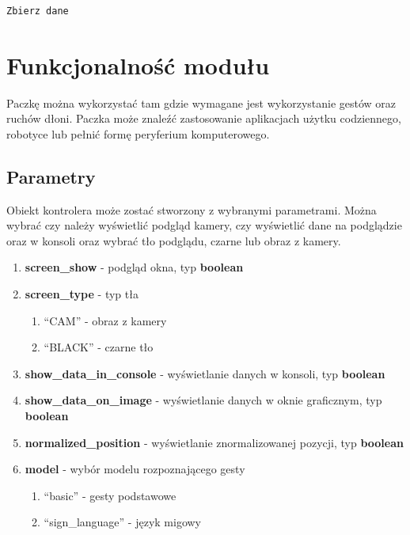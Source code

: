 \begin{lstlisting}[language=python]
    Zbierz dane
\end{lstlisting}

\section{Funkcjonalność modułu}
\quad Paczkę można wykorzystać tam gdzie wymagane jest wykorzystanie gestów oraz ruchów dłoni. Paczka może znaleźć zastosowanie aplikacjach użytku codziennego, robotyce lub pełnić formę peryferium komputerowego.  

\subsection{Parametry}
\label{parametry}
\quad Obiekt kontrolera może zostać stworzony z wybranymi parametrami. Można wybrać czy należy wyświetlić podgląd kamery, czy wyświetlić dane na podglądzie oraz w konsoli oraz wybrać tło podglądu, czarne lub obraz z kamery. 


\begin{enumerate}
    \item \textbf{screen\_show} - podgląd okna, typ \textbf{boolean}
    \item \textbf{screen\_type} - typ tła
    \begin{enumerate}
        \item \enquote{CAM} - obraz z kamery
        \item \enquote{BLACK} - czarne tło
    \end{enumerate}
    \item \textbf{show\_data\_in\_console} - wyświetlanie danych w konsoli, typ \textbf{boolean}
    \item \textbf{show\_data\_on\_image} - wyświetlanie danych w oknie graficznym, typ \textbf{boolean}
    \item \textbf{normalized\_position} - wyświetlanie znormalizowanej pozycji, typ \textbf{boolean}
    \item \textbf{model} - wybór modelu rozpoznającego gesty
    \begin{enumerate}
        \item \enquote{basic} - gesty podstawowe
        \item \enquote{sign\_language} - język migowy
    \end{enumerate}
\end{enumerate}


